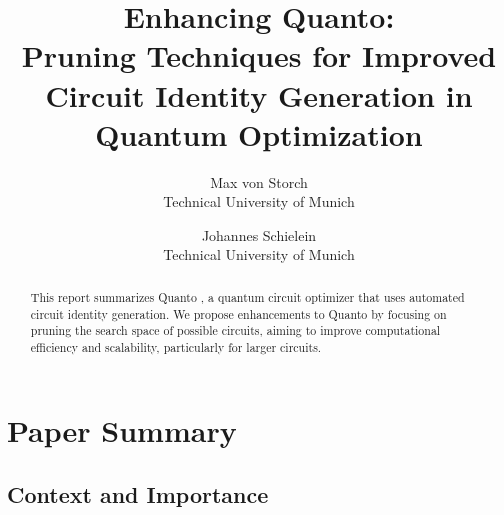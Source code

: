 \renewcommand\theadalign{bc}
\renewcommand\theadfont{\bfseries}

\usepackage{filecontents}





\title{\Large \bf Enhancing Quanto:\\Pruning Techniques for Improved Circuit Identity Generation in Quantum Optimization}

\author{
{\rm Max von Storch}\\
Technical University of Munich
\and
{\rm Johannes Schielein}\\
Technical University of Munich
} %

\maketitle

\begin{abstract}
This report summarizes Quanto \cite{2021quanto}, a quantum circuit optimizer that uses automated circuit identity generation. We propose enhancements to Quanto by focusing on pruning the search space of possible circuits, aiming to improve computational efficiency and scalability, particularly for larger circuits.  
\end{abstract}


\section{Paper Summary}

\subsection{Context and Importance}

